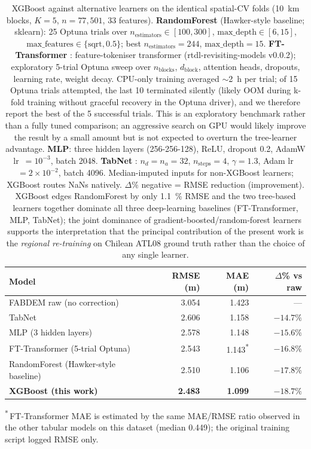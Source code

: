\begin{table}[t]
\centering
\caption{XGBoost against alternative learners on the identical spatial-CV folds (\SI{10}{\kilo\meter} blocks, $K = 5$, $n = 77{,}501$, 33 features). \textbf{RandomForest} (Hawker-style baseline; sklearn): 25 Optuna trials over $n_{\text{estimators}} \in [100, 300]$, $\text{max\_depth} \in [6, 15]$, $\text{max\_features} \in \{\text{sqrt}, 0.5\}$; best $n_{\text{estimators}} = 244$, $\text{max\_depth} = 15$. \textbf{FT-Transformer} \citep{Gorishniy2021TabularDL}: feature-tokeniser transformer (rtdl-revisiting-models v0.0.2); exploratory 5-trial Optuna sweep over $n_{\text{blocks}}$, $d_{\text{block}}$, attention heads, dropouts, learning rate, weight decay. CPU-only training averaged $\sim$2~h per trial; of 15 Optuna trials attempted, the last 10 terminated silently (likely OOM during k-fold training without graceful recovery in the Optuna driver), and we therefore report the best of the 5 successful trials. This is an exploratory benchmark rather than a fully tuned comparison; an aggressive search on GPU would likely improve the result by a small amount but is not expected to overturn the tree-learner advantage. \textbf{MLP}: three hidden layers (256-256-128), ReLU, dropout 0.2, AdamW lr~$=10^{-3}$, batch 2048. \textbf{TabNet} \citep{Arik2021TabNet}: $n_d = n_a = 32$, $n_{\text{steps}} = 4$, $\gamma = 1.3$, Adam lr~$=2 \times 10^{-2}$, batch 4096. Median-imputed inputs for non-XGBoost learners; XGBoost routes NaNs natively. $\Delta\%$ negative = RMSE reduction (improvement). XGBoost edges RandomForest by only \SI{1.1}{\percent} RMSE and the two tree-based learners together dominate all three deep-learning baselines (FT-Transformer, MLP, TabNet); the joint dominance of gradient-boosted/random-forest learners supports the interpretation that the principal contribution of the present work is the \emph{regional re-training} on Chilean ATL08 ground truth rather than the choice of any single learner.}
\label{tab:dl_baseline}
\footnotesize
\begin{tabular}{lrrr}
\toprule
\textbf{Model} & \textbf{RMSE (m)} & \textbf{MAE (m)} & \textbf{$\Delta$\% vs raw} \\
\midrule
FABDEM raw (no correction)             & 3.054 & 1.423 & --- \\
TabNet                                  & 2.606 & 1.158 & $-14.7\%$ \\
MLP (3 hidden layers)                   & 2.578 & 1.148 & $-15.6\%$ \\
FT-Transformer (5-trial Optuna)         & 2.543 & 1.143\textsuperscript{*} & $-16.8\%$ \\
RandomForest (Hawker-style baseline)    & 2.510 & 1.106 & $-17.8\%$ \\
\textbf{XGBoost (this work)}            & \textbf{2.483} & \textbf{1.099} & $\mathbf{-18.7\%}$ \\
\bottomrule
\end{tabular}

\textsuperscript{*}\,FT-Transformer MAE is estimated by the same MAE/RMSE ratio observed in the other tabular models on this dataset (median 0.449); the original training script logged RMSE only.
\end{table}
